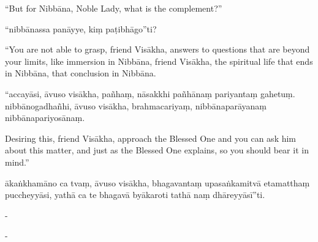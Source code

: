 \begin{samepage}
\begin{leftcolumn*}
“But for Nibbāna, Noble Lady, what is the complement?”
\end{leftcolumn*}

\begin{rightcolumn}
“nibbānassa panāyye, kiṃ paṭibhāgo”ti?
\end{rightcolumn}
\end{samepage}

\begin{samepage}
\begin{leftcolumn*}
“You are not able to grasp, friend Visākha, answers to questions that are beyond your limits, like immersion in Nibbāna, friend Visākha, the spiritual life that ends in Nibbāna, that conclusion in Nibbāna.
\end{leftcolumn*}

\begin{rightcolumn}
“accayāsi, āvuso visākha, pañhaṃ, nāsakkhi pañhānaṃ pariyantaṃ gahetuṃ. nibbānogadhañhi, āvuso visākha, brahmacariyaṃ, nibbānaparāyanaṃ nibbānapariyosānaṃ.
\end{rightcolumn}
\end{samepage}

\begin{samepage}
\begin{leftcolumn*}
Desiring this, friend Visākha, approach the Blessed One and you can ask him about this matter, and just as the Blessed One explains, so you should bear it in mind.”
\end{leftcolumn*}

\begin{rightcolumn}
ākaṅkhamāno ca tvaṃ, āvuso visākha, bhagavantaṃ upasaṅkamitvā etamatthaṃ puccheyyāsi, yathā ca te bhagavā byākaroti tathā naṃ dhāreyyāsī”ti.
\end{rightcolumn}
\end{samepage}

\begin{samepage}
\begin{leftcolumn*}
-
\end{leftcolumn*}

\begin{rightcolumn}
-
\end{rightcolumn}
\end{samepage}

